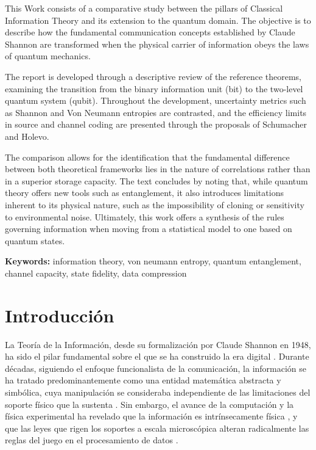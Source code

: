 \documentclass[11pt,a4paper,spanish]{book}
\begin{document}
This Work consists of a comparative study between the pillars of Classical Information Theory and its extension to the quantum domain. The objective is to describe how the fundamental communication concepts established by Claude Shannon are transformed when the physical carrier of information obeys the laws of quantum mechanics.

The report is developed through a descriptive review of the reference theorems, examining the transition from the binary information unit (bit) to the two-level quantum system (qubit). Throughout the development, uncertainty metrics such as Shannon and Von Neumann entropies are contrasted, and the efficiency limits in source and channel coding are presented through the proposals of Schumacher and Holevo.

The comparison allows for the identification that the fundamental difference between both theoretical frameworks lies in the nature of correlations rather than in a superior storage capacity. The text concludes by noting that, while quantum theory offers new tools such as entanglement, it also introduces limitations inherent to its physical nature, such as the impossibility of cloning or sensitivity to environmental noise. Ultimately, this work offers a synthesis of the rules governing information when moving from a statistical model to one based on quantum states.

\vspace{0.5cm}
{\bf Keywords:} information theory, von neumann entropy, quantum entanglement, channel capacity, state fidelity, data compression
\mainmatter

\chapter{Introducción}

La Teoría de la Información, desde su formalización por Claude Shannon en 1948, ha sido el pilar fundamental sobre el que se ha construido la era digital \citep{shannon1948}. Durante décadas, siguiendo el enfoque funcionalista de la comunicación, la información se ha tratado predominantemente como una entidad matemática abstracta y simbólica, cuya manipulación se consideraba independiente de las limitaciones del soporte físico que la sustenta \citep{shannon1948, cherry1952}. Sin embargo, el avance de la computación y la física experimental ha revelado que la información es intrínsecamente física \citep{landauer1991}, y que las leyes que rigen los soportes a escala microscópica alteran radicalmente las reglas del juego en el procesamiento de datos \citep{deutsch1985}.
\end{document}
